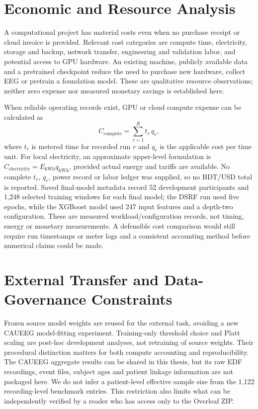 \section{Economic and Resource Analysis}
A computational project has material costs even when no purchase receipt or cloud invoice is provided. Relevant cost categories are compute time, electricity, storage and backup, network transfer, engineering and validation labor, and potential access to GPU hardware. An existing machine, publicly available data and a pretrained checkpoint reduce the need to purchase new hardware, collect EEG or pretrain a foundation model. These are qualitative resource observations; neither zero expense nor measured monetary savings is established here.

When reliable operating records exist, GPU or cloud compute expense can be calculated as
\begin{equation}
 C_{\mathrm{compute}}=\sum_{r=1}^{R} t_r\,q_r,
 \label{eq:compute-cost}
\end{equation}
where $t_r$ is metered time for recorded run $r$ and $q_r$ is the applicable cost per time unit. For local electricity, an approximate upper-level formulation is $C_{\mathrm{electricity}}=E_{\mathrm{kWh}}q_{\mathrm{kWh}}$, provided actual energy and tariffs are available. No complete $t_r$, $q_r$, power record or labor ledger was supplied, so no BDT/USD total is reported. Saved final-model metadata record 52 development participants and 1,248 selected training windows for each final model; the DSRF run used five epochs, while the XGBoost model used 247 input features and a depth-two configuration. These are measured workload/configuration records, not timing, energy or monetary measurements. A defensible cost comparison would still require run timestamps or meter logs and a consistent accounting method before numerical claims could be made.


\section{External Transfer and Data-Governance Constraints}
Frozen source model weights are reused for the external task, avoiding a new CAUEEG model-fitting experiment. Training-only threshold choice and Platt scaling are post-hoc development analyses, not retraining of source weights. Their procedural distinction matters for both compute accounting and reproducibility. The CAUEEG aggregate results can be shared in this thesis, but its raw EDF recordings, event files, subject ages and patient linkage information are not packaged here. We do not infer a patient-level effective sample size from the 1,122 recording-level benchmark entries. This restriction also limits what can be independently verified by a reader who has access only to the Overleaf ZIP.

